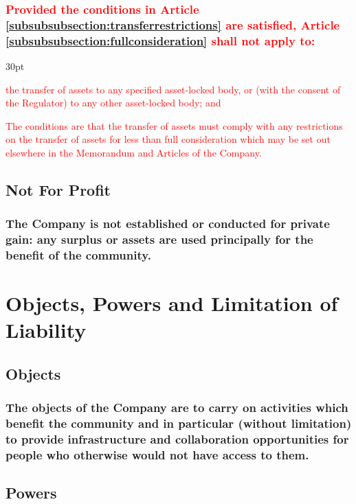 \documentclass[12pt]{article}
\def\clauseindent{30pt}
\newenvironment{subindent}{\begin{adjustwidth}{\clauseindent}{}\begin{hanginglist}}{\end{hanginglist}\end{adjustwidth}}
\begin{document}
  \subsubsection{\textcolor{red}{Provided the conditions in Article \ref{subsubsubsection:transferrestrictions} are satisfied, Article \ref{subsubsubsection:fullconsideration} shall not apply to:}}
  \begin{subindent}
    \item\textcolor{red}{the transfer of assets to any specified asset-locked body, or (with the consent of the Regulator) to any other asset-locked body; and}
    \item\label{subsubsubsection:transferrestrictions}\textcolor{red}{The conditions are that the transfer of assets must comply with any restrictions on the transfer of assets for less than full consideration which may be set out elsewhere in the Memorandum and Articles of the Company.}
  \end{subindent}
\subsection{Not For Profit}
\subsubsection{The Company is not established or conducted for private gain: any surplus or assets are
used principally for the benefit of the community.}

\section*{Objects, Powers and Limitation of Liability}

\subsection{Objects}
\subsubsection{The objects of the Company are to carry on activities which benefit the community and in particular (without limitation) to provide infrastructure and collaboration opportunities for people who otherwise would not have access to them.}

\subsection{Powers}
\end{document}
